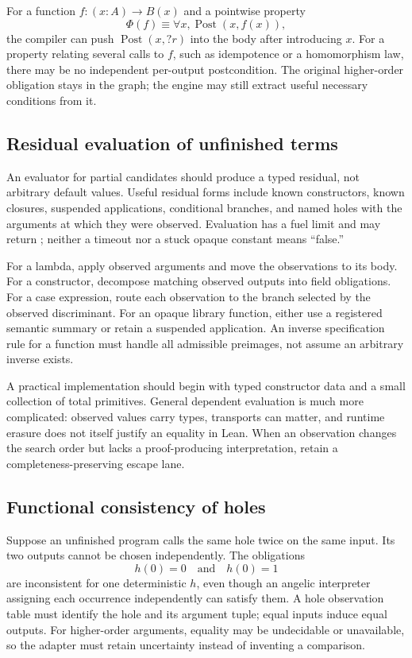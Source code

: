 \documentclass[11pt,letterpaper]{article}
\newcommand{\id}[1]{\texttt{\detokenize{#1}}}
\newcommand{\Spec}{\Phi}
\theoremstyle{definition}
\theoremstyle{remark}
\begin{document}
For a function $f:(x:A)\to B(x)$ and a pointwise property
\[
 \Spec(f) \equiv \forall x,\operatorname{Post}(x,f(x)),
\]
the compiler can push $\operatorname{Post}(x,?r)$ into the body after introducing $x$. For a property relating several calls to $f$, such as idempotence or a homomorphism law, there may be no independent per-output postcondition. The original higher-order obligation stays in the graph; the engine may still extract useful necessary conditions from it.

\subsection{Residual evaluation of unfinished terms}

An evaluator for partial candidates should produce a typed residual, not arbitrary default values. Useful residual forms include known constructors, known closures, suspended applications, conditional branches, and named holes with the arguments at which they were observed. Evaluation has a fuel limit and may return \id{Unknown}; neither a timeout nor a stuck opaque constant means ``false.''

For a lambda, apply observed arguments and move the observations to its body. For a constructor, decompose matching observed outputs into field obligations. For a case expression, route each observation to the branch selected by the observed discriminant. For an opaque library function, either use a registered semantic summary or retain a suspended application. An inverse specification rule for a function must handle all admissible preimages, not assume an arbitrary inverse exists.

A practical implementation should begin with typed constructor data and a small collection of total primitives. General dependent evaluation is much more complicated: observed values carry types, transports can matter, and runtime erasure does not itself justify an equality in Lean. When an observation changes the search order but lacks a proof-producing interpretation, retain a completeness-preserving escape lane.

\subsection{Functional consistency of holes}

Suppose an unfinished program calls the same hole twice on the same input. Its two outputs cannot be chosen independently. The obligations
\[
 h(0)=0 \quad\text{and}\quad h(0)=1
\]
are inconsistent for one deterministic $h$, even though an angelic interpreter assigning each occurrence independently can satisfy them. A hole observation table must identify the hole and its argument tuple; equal inputs induce equal outputs. For higher-order arguments, equality may be undecidable or unavailable, so the adapter must retain uncertainty instead of inventing a comparison.
\end{document}
